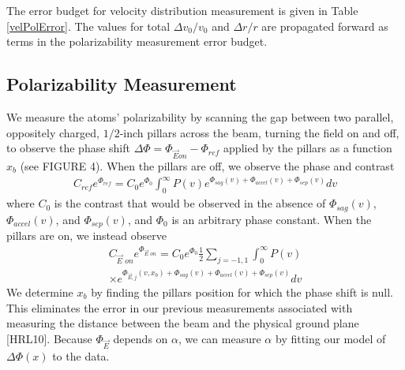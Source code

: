 \documentclass[twocolumn, prl,showpacs,superscriptaddress]{revtex4-1}   %
\begin{document}
The error budget for velocity distribution measurement is given in Table \ref{velPolError}. The values for total $\Delta v_0/v_0$ and $\Delta r/r$ are propagated forward as terms in the polarizability measurement error budget.

\subsection{Polarizability Measurement}

We measure the atoms' polarizability by scanning the gap between two parallel, oppositely charged, $1/2$-inch pillars across the beam, turning the field on and off, to observe the phase shift $\Delta\Phi = \Phi_{\vec{E} on} - \Phi_{ref}$ applied by the pillars as a function $x_b$ (see FIGURE 4). When the pillars are off, we observe the phase and contrast
\begin{align}
	C_{ref}e^{\Phi_{ref}} = 
		C_0e^{\Phi_0}
		\int_0^{\infty} P(v) 
		e^{\Phi_{sag}(v) + \Phi_{accel}(v) + \Phi_{sep}(v)} 
		dv
	\label{CPRef}
\end{align}
where $C_0$ is the contrast that would be observed in the absence of $\Phi_{sag}(v)$, $\Phi_{accel}(v)$, and $\Phi_{sep}(v)$, and $\Phi_0$ is an arbitrary phase constant. When the pillars are on, we instead observe
\begin{align}
	C_{\vec{E}\textit{ on}}e^{\Phi_{\vec{E}\textit{ on}}} = 
		C_0e^{\Phi_0}		
		\frac{1}{2} \sum_{j=-1,1}
		\int_0^{\infty} P(v) \nonumber \\ \times
		e^{
			\Phi_{\vec{E},j}(v,x_b) + 
			\Phi_{sag}(v) + \Phi_{accel}(v) + \Phi_{sep}(v)
		} 
		dv
	\label{CPEOn}
\end{align}
We determine $x_b$ by finding the pillars position for which the phase shift is null. This eliminates the error in our previous measurements associated with measuring the distance between the beam and the physical ground plane [HRL10].
Because $\Phi_{\vec{E}}$ depends on $\alpha$, we can measure $\alpha$ by fitting our model of $\Delta\Phi(x)$ to the data.
\end{document}
